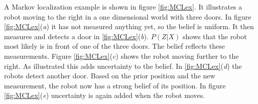 A Markov localization example is shown in figure \ref{fig:MCLex}. It illustrates a robot moving to the right in a one dimensional world with three doors. In figure \ref{fig:MCLex}(\emph{a}) it has not measured anything yet, so the belief is uniform. It then measures and detects a door in \ref{fig:MCLex}(\emph{b}). $P(Z|X)$ shows that the robot most likely is in front of one of the three doors. The belief reflects these measurements. 
Figure \ref{fig:MCLex}(\emph{c}) shows the robot moving further to the right. As illustrated this adds uncertainty to the belief. In \ref{fig:MCLex}(\emph{d}) the robots detect another door. Based on the prior position and the new measurement, the robot now has a strong belief of its position.
In figure \ref{fig:MCLex}(\emph{e}) uncertainty is again added when the robot moves.

